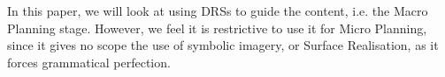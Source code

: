 In this paper, we will look at using DRSs to guide the content, i.e. the Macro Planning stage. However, we feel it is restrictive to use it for Micro Planning, since it gives no scope the use of symbolic imagery, or Surface Realisation, as it forces grammatical perfection.






